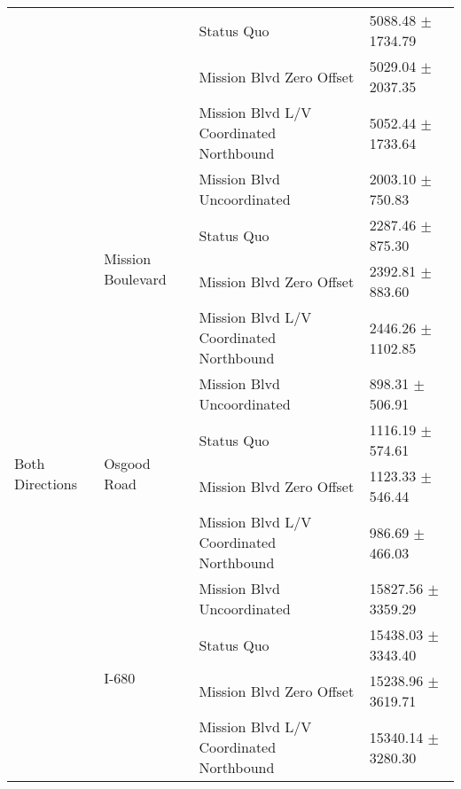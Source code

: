 \begin{table}
\begin{tabular}{llll}
 &  & Status Quo & 5088.48 $\pm$ 1734.79 \\
 &  & Mission Blvd Zero Offset & 5029.04 $\pm$ 2037.35 \\
 &  & Mission Blvd L/V Coordinated Northbound & 5052.44 $\pm$ 1733.64 \\
\multirow[t]{12}{*}{Both Directions} & \multirow[t]{4}{*}{Mission Boulevard} & Mission Blvd Uncoordinated & 2003.10 $\pm$ 750.83 \\
 &  & Status Quo & 2287.46 $\pm$ 875.30 \\
 &  & Mission Blvd Zero Offset & 2392.81 $\pm$ 883.60 \\
 &  & Mission Blvd L/V Coordinated Northbound & 2446.26 $\pm$ 1102.85 \\
 & \multirow[t]{4}{*}{Osgood Road} & Mission Blvd Uncoordinated & 898.31 $\pm$ 506.91 \\
 &  & Status Quo & 1116.19 $\pm$ 574.61 \\
 &  & Mission Blvd Zero Offset & 1123.33 $\pm$ 546.44 \\
 &  & Mission Blvd L/V Coordinated Northbound & 986.69 $\pm$ 466.03 \\
 & \multirow[t]{4}{*}{I-680} & Mission Blvd Uncoordinated & 15827.56 $\pm$ 3359.29 \\
 &  & Status Quo & 15438.03 $\pm$ 3343.40 \\
 &  & Mission Blvd Zero Offset & 15238.96 $\pm$ 3619.71 \\
 &  & Mission Blvd L/V Coordinated Northbound & 15340.14 $\pm$ 3280.30 \\
\bottomrule
\end{tabular}
\end{table}

